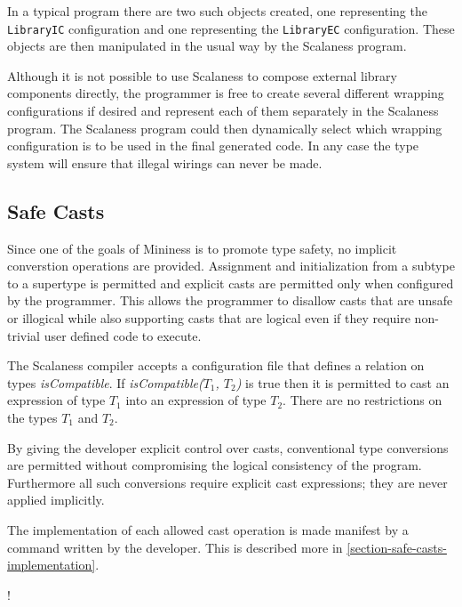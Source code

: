 In a typical program there are two such objects created, one representing the
\lstinline!LibraryIC! configuration and one representing the \lstinline!LibraryEC!
configuration. These objects are then manipulated in the usual way by the Scalaness program.

Although it is not possible to use Scalaness to compose external library components directly,
the programmer is free to create several different wrapping configurations if desired and
represent each of them separately in the Scalaness program. The Scalaness program could then
dynamically select which wrapping configuration is to be used in the final generated code. In
any case the type system will ensure that illegal wirings can never be made.

\subsection{Safe Casts}
\label{section-safe-casts-design}

Since one of the goals of Mininess is to promote type safety, no implicit converstion operations
are provided. Assignment and initialization from a subtype to a supertype is permitted and
explicit casts are permitted only when configured by the programmer. This allows the programmer
to disallow casts that are unsafe or illogical while also supporting casts that are logical even
if they require non-trivial user defined code to execute.

The Scalaness compiler accepts a configuration file that defines a relation on types
\textit{isCompatible}. If \textit{isCompatible($T_1$, $T_2$)} is true then it is permitted to
cast an expression of type $T_1$ into an expression of type $T_2$. There are no restrictions on
the types $T_1$ and $T_2$.

By giving the developer explicit control over casts, conventional type conversions are permitted
without compromising the logical consistency of the program. Furthermore all such conversions
require explicit cast expressions; they are never applied implicitly.

The implementation of each allowed cast operation is made manifest by a command written by the
developer. This is described more in \autoref{section-safe-casts-implementation}.

\lstDeleteShortInline!

